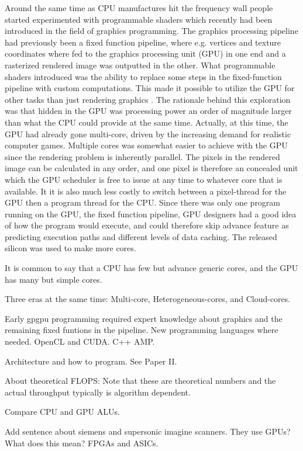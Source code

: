 Around the same time as CPU manufactures hit the frequency wall people started experimented with programmable shaders which recently had been introduced in the field of graphics programming. The graphics processing pipeline had previously been a fixed function pipeline, where e.g. vertices and texture coordinates where fed to the graphics processing unit (GPU) in one end and a rasterized rendered image was outputted in the other. What programmable shaders  introduced was the ability to replace some steps in the fixed-function pipeline with custom computations. This made it possible to utilize the GPU for other tasks than just rendering graphics \cite{Seland2007}. The rationale behind this exploration was that hidden in the GPU was processing power an order of magnitude larger than what the CPU could provide at the same time. Actually, at this time, the GPU had already gone multi-core, driven by the increasing demand for realistic computer games. Multiple cores was somewhat easier to achieve with the GPU since the rendering problem is inherently parallel. The pixels in the rendered image can be calculated in any order, and one pixel is therefore an concealed unit which the GPU scheduler is free to issue at any time to whatever core that is available. It it is also much less costly to switch between a pixel-thread for the GPU then a program thread for the CPU. Since there was only one program running on the GPU, the fixed function pipeline, GPU designers had a good idea of how the program would execute, and could therefore skip advance feature as predicting execution paths and different levels of data caching.  The released silicon was used to make more cores. 

It is common to say that a CPU has few but advance generic cores, and the GPU has many but simple cores.

Three eras at the same time: Multi-core, Heterogeneous-cores, and Cloud-cores.

Early gpgpu programming required expert knowledge about graphics and the remaining fixed funtions in the pipeline. New programming languages where needed. OpenCL and CUDA. C++ AMP.

Architecture and how to program. See Paper II.

About theoretical FLOPS: Note that these are theoretical numbers and the actual throughput typically is algorithm dependent.

Compare CPU and GPU ALUs.

Add sentence about siemens and supersonic imagine scanners. They use GPUs? What does this mean? FPGAs and ASICs.

